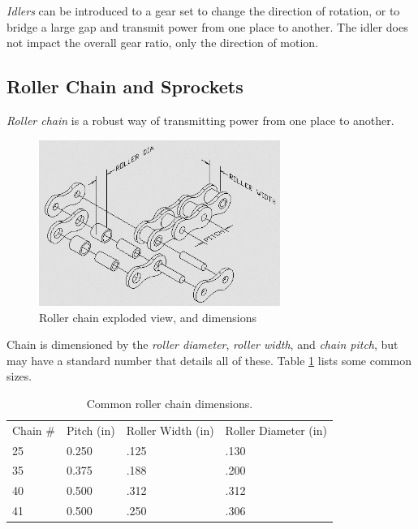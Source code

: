 \documentclass[10pt,letterpaper]{book}
\begin{document}
\textit{Idlers} can be introduced to a gear set to change the direction of rotation, or to bridge a large gap and transmit power from one place to another. The idler does not impact the overall gear ratio, only the direction of motion.



\newpage

\subsection{Roller Chain and Sprockets}

\textit{Roller chain} is a robust way of transmitting power from one place to another. 

\begin{figure}[H]
	\includegraphics[width=0.7\textwidth]{imgs/rollerchain_nomenclature.png}
	\caption{Roller chain exploded view, and dimensions}
\end{figure}

Chain is dimensioned by the \textit{roller diameter}, \textit{roller width}, and \textit{chain pitch}, but may have a standard number that details all of these. Table \ref{table:chaindims} lists some common sizes.

\begin{table}[H] \label{table:chaindims}
\begin{tabular}{llll}
Chain \# & Pitch (in) & Roller Width (in) & Roller Diameter (in) \\
25       & 0.250      & .125              & .130                 \\
35       & 0.375      & .188              & .200                 \\
40       & 0.500      & .312              & .312                 \\
41       & 0.500      & .250              & .306                
\end{tabular}
\caption{Common roller chain dimensions.}
\end{table}
\end{document}
